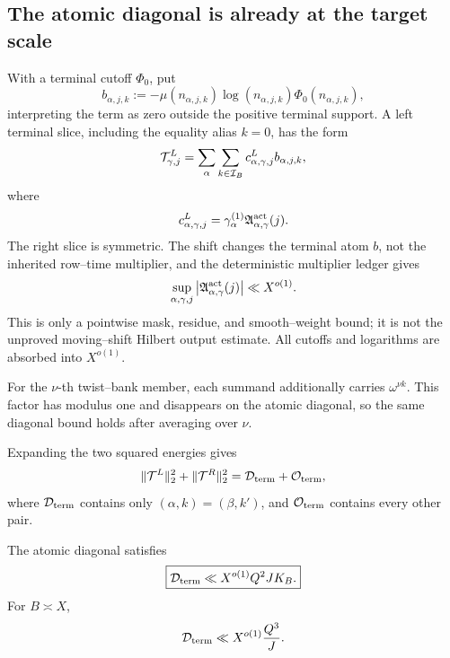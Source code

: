 \subsection{The atomic diagonal is already at the target scale}

With a terminal cutoff \(\Phi_0\), put
\begin{equation}
 b_{\alpha,j,k}
 :=-\mu(n_{\alpha,j,k})\log(n_{\alpha,j,k})
 \Phi_0(n_{\alpha,j,k}),
 \label{eq:tpc39-terminal-b}
\end{equation}
interpreting the term as zero outside the positive terminal support.  A
left terminal slice, including the equality alias \(k=0\), has the form
\begin{equation}
 \mathcal T_{\gamma,j}^{L}
 =\sum_\alpha\sum_{k\in\mathcal I_B}
 c_{\alpha,\gamma,j}^{L}b_{\alpha,j,k},
 \label{eq:tpc39-terminal-left-slice}
\end{equation}
where
\begin{equation}
 c_{\alpha,\gamma,j}^{L}
 =\gamma_\alpha^{(1)}
 \mathfrak A_{\alpha,\gamma}^{\rm act}(j).
 \label{eq:tpc39-terminal-left-coefficient}
\end{equation}
The right slice is symmetric.  The shift changes the terminal atom \(b\),
not the inherited row--time multiplier, and the deterministic multiplier
ledger gives
\begin{equation}
 \sup_{\alpha,\gamma,j}
 \left|\mathfrak A_{\alpha,\gamma}^{\rm act}(j)\right|
 \ll X^{o(1)}.
 \label{eq:tpc39-terminal-multiplier-ledger}
\end{equation}
This is only a pointwise mask, residue, and smooth--weight bound; it is not
the unproved moving--shift Hilbert output estimate.  All cutoffs and
logarithms are absorbed into \(X^{o(1)}\).

For the \(\nu\)-th twist--bank member, each summand additionally carries
\(\omega^{\nu k}\).  This factor has modulus one and disappears on the
atomic diagonal, so the same diagonal bound holds after averaging over
\(\nu\).

Expanding the two squared energies gives
\begin{equation}
 \|\mathcal T^{L}\|_2^2+\|\mathcal T^{R}\|_2^2
 =\mathcal D_{\rm term}+\mathcal O_{\rm term},
 \label{eq:tpc39-terminal-diagonal-offdiagonal}
\end{equation}
where \(\mathcal D_{\rm term}\) contains only
\((\alpha,k)=(\beta,k')\), and \(\mathcal O_{\rm term}\) contains every other
pair.

\begin{proposition}
\label{prop:tpc39-terminal-diagonal-closure}
The atomic diagonal satisfies
\begin{equation}
 \boxed{
 \mathcal D_{\rm term}
 \ll X^{o(1)}Q^2JK_B.}
 \label{eq:tpc39-terminal-diagonal-bound}
\end{equation}
For \(B\asymp X\),
\begin{equation}
 \mathcal D_{\rm term}
 \ll X^{o(1)}\frac{Q^3}{J}.
 \label{eq:tpc39-terminal-diagonal-endpoint}
\end{equation}
\end{proposition}

